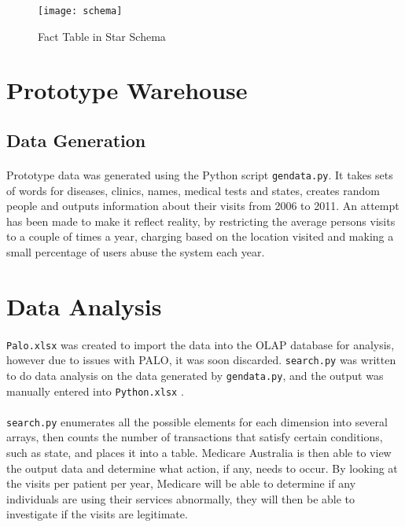 \documentclass[a4paper,12pt,openbib]{article}
\begin{document}
\begin{figure}[ht!]
	\centering
	\texttt{[image: schema]}
	\caption{Fact Table in Star Schema}
	\label{fig:schema}
\end{figure}

\section*{Prototype Warehouse}
\subsection*{Data Generation}
\paragraph{}
	Prototype data was generated using the Python script \texttt{gendata.py}.
	It takes sets of words for diseases, clinics, names, medical tests and states, creates random people and outputs information about their visits from 2006 to 2011.
	An attempt has been made to make it reflect reality, by restricting the average persons visits to a couple of times a year, charging based on the location visited and making a small percentage of users abuse the system each year.

\section*{Data Analysis}
\paragraph{}
	\texttt{Palo.xlsx} was created to import the data into the OLAP database for analysis, however due to issues with PALO, it was soon discarded.
	\texttt{search.py} was written to do data analysis on the data generated by \texttt{gendata.py}, and the output was manually entered into \texttt{Python.xlsx} .
\paragraph{}
	\texttt{search.py} enumerates all the possible elements for each dimension into several arrays, then counts the number of transactions that satisfy certain conditions, such as state, and places it into a table.
	Medicare Australia is then able to view the output data and determine what action, if any, needs to occur.
	By looking at the visits per patient per year, Medicare will be able to determine if any individuals are using their services abnormally, they will then be able to investigate if the visits are legitimate.
\end{document}
